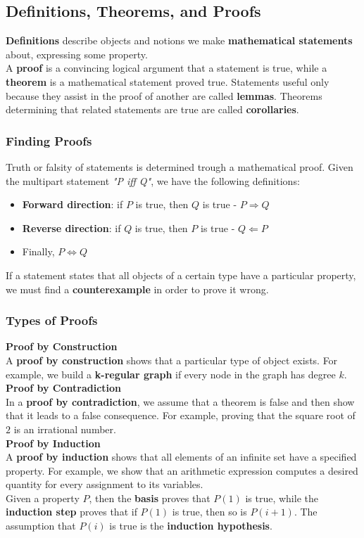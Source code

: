 \documentclass{article}
\begin{document}
\subsection{Definitions, Theorems, and Proofs}
\textbf{Definitions} describe objects and notions we make \textbf{mathematical statements} about, expressing some property. \\
A \textbf{proof} is a convincing logical argument that a statement is true, while a \textbf{theorem} is a mathematical statement proved true. Statements useful only because they assist in the proof of another are called \textbf{lemmas}. Theorems determining that related statements are true are called \textbf{corollaries}.
\subsubsection{Finding Proofs}
Truth or falsity of statements is determined trough a mathematical proof. Given the multipart statement \textit{"P iff Q"}, we have the following definitions:
\begin{itemize}
    \item \textbf{Forward direction}: if $P$ is true, then $Q$ is true - $P \Rightarrow Q$
    \item \textbf{Reverse direction}: if $Q$ is true, then $P$ is true - $Q \Leftarrow P$
    \item Finally, $P \iff Q$
\end{itemize}
If a statement states that all objects of a certain type have a particular property, we must find a \textbf{counterexample} in order to prove it wrong.
\subsubsection{Types of Proofs}
\textbf{Proof by Construction}
\vspace{0.2cm} \\
A \textbf{proof by construction} shows that a particular type of object exists. For example, we build a \textbf{k-regular graph} if every node in the graph has degree $k$.
\vspace{0.1cm} \\
\textbf{Proof by Contradiction}
\vspace{0.2cm} \\
In a \textbf{proof by contradiction}, we assume that a theorem is false and then show that it leads to a false consequence. For example, proving that the square root of $2$ is an irrational number.
\vspace{0.5cm} \\
\textbf{Proof by Induction}
\vspace{0.2cm} \\
A \textbf{proof by induction} shows that all elements of an infinite set have a specified property. For example, we show that an arithmetic expression computes a desired quantity for every assignment to its variables. \\
Given a property $P$, then the \textbf{basis} proves that $P(1)$ is true, while the \textbf{induction step} proves that if $P(1)$ is true, then so is $P(i + 1)$. The assumption that $P(i)$ is true is the \textbf{induction hypothesis}.
\end{document}
